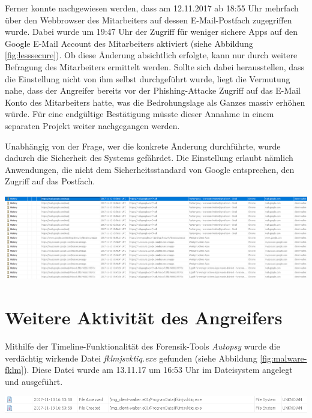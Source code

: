 Ferner konnte nachgewiesen werden, dass am 12.11.2017 ab 18:55 Uhr mehrfach über den Webbrowser des Mitarbeiters auf dessen E-Mail-Postfach  zugegriffen wurde.
Dabei wurde um 19:47 Uhr der Zugriff für weniger sichere Apps auf den Google E-Mail Account des Mitarbeiters aktiviert (siehe Abbildung \ref{fig:lesssecure}).
Ob diese Änderung absichtlich erfolgte, kann nur durch weitere Befragung des Mitarbeiters ermittelt werden.
Sollte sich dabei herausstellen, dass die Einstellung nicht von ihm selbst durchgeführt wurde, liegt die Vermutung nahe, dass der Angreifer bereits vor der Phishing-Attacke Zugriff auf das E-Mail Konto des Mitarbeiters hatte, was die Bedrohungslage als Ganzes massiv erhöhen würde.
Für eine endgültige Bestätigung müsste dieser Annahme in einem separaten Projekt weiter nachgegangen werden.

Unabhängig von der Frage, wer die konkrete Änderung durchführte, wurde dadurch die Sicherheit des Systems gefährdet. Die Einstellung erlaubt nämlich Anwendungen, die nicht dem Sicherheitsstandard von Google entsprechen, den Zugriff auf das Postfach.

\begin{center}
	\includegraphics[width=15.8cm]{figures/lesssecure.png}
	\label{fig:lesssecure}
\end{center}

\chapter{Weitere Aktivität des Angreifers}
Mithilfe der Timeline-Funktionalität des Forensik-Tools \textit{Autopsy} wurde die verdächtig wirkende Datei \textit{fklmjsvktiq.exe} gefunden (siehe Abbildung \ref{fig:malware-fklm}).
Diese Datei wurde am 13.11.17 um 16:53 Uhr im Dateisystem angelegt und ausgeführt.

\begin{center}
	\includegraphics[width=15.8cm]{figures/malware-fklm.png}
	\label{fig:malware-fklm}
\end{center}

